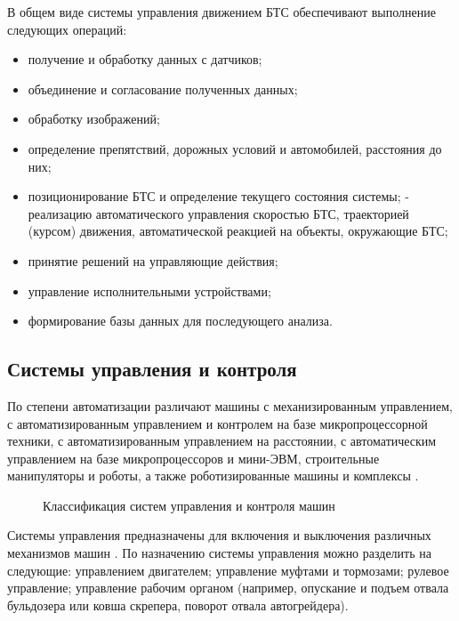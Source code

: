 В общем виде системы управления движением БТС обеспечивают выполнение следующих операций:

\begin{itemize}
    \item получение и обработку данных с датчиков;
    \item объединение и согласование полученных данных;
    \item обработку изображений;
    \item определение препятствий, дорожных условий и автомобилей, расстояния до них;
    \item позиционирование БТС и определение текущего состояния системы;
    - реализацию автоматического управления скоростью БТС, траекторией (курсом) движения, автоматической реакцией на объекты, окружающие БТС;
    \item принятие решений на управляющие действия;
    \item управление исполнительными устройствами;
    \item формирование базы данных для последующего анализа.
\end{itemize}

\subsection{Системы управления и контроля}\label{subsec:ch1/sec2/sub1}

По степени автоматизации различают машины с механизированным управлением, с автоматизированным управлением и контролем на базе микропроцессорной техники, с автоматизированным управлением на расстоянии, с автоматическим управлением на базе микропроцессоров и мини-ЭВМ, строительные манипуляторы и роботы, а также роботизированные машины и комплексы \cite[с.~39]{Evtukov}.

\begin{figure}[ht]
	\caption{Классификация систем управления и контроля машин}\label{fig:control_drawio}
\end{figure}

Системы управления предназначены для включения и выключения различных механизмов машин \cite[с.~109]{Evtukov}.
По назначению системы управления можно разделить на следующие: управлением двигателем; управление муфтами и тормозами; рулевое управление; управление рабочим органом (например, опускание и подъем отвала бульдозера или ковша скрепера, поворот отвала автогрейдера).

